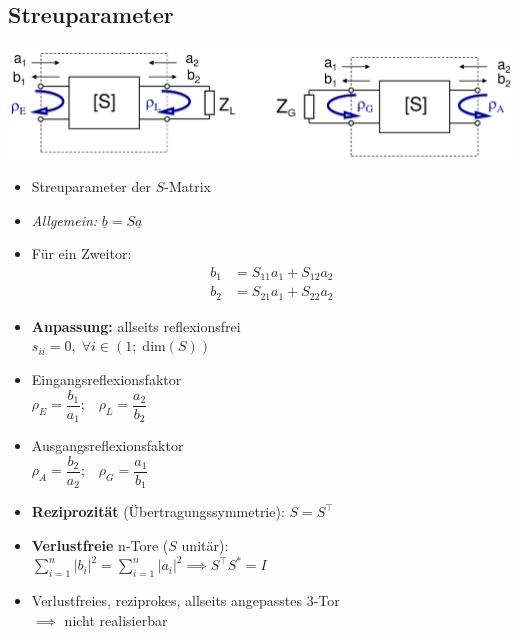 \subsection{Streuparameter}
\includegraphics[width=0.35\paperheight]{content/fuw/pictures/hf_zweitor_reflektion.png}
\begin{itemize}
    \itemsep0pt
    \item Streuparameter der $S$-Matrix
    \item \textit{Allgemein:} \(\underline{b} = S \underline{a}\)
    \item Für ein Zweitor:
    \begin{align*}
        b_1 &= S_{11} a_1 + S_{12} a_2\\
        b_2 &= S_{21} a_1 + S_{22} a_2
    \end{align*}
    \item \textbf{Anpassung:} allseits reflexionsfrei\\
        \(s_{ii} = 0, \;\forall i \in (1;\; \mathrm{dim}(S))\)
    \item Eingangsreflexionsfaktor\\
        \(\rho_E = \dfrac{b_1}{a_1}; \;\;\; \rho_L = \dfrac{a_2}{b_2}\)
    \item Ausgangsreflexionsfaktor\\
        \(\rho_A = \dfrac{b_2}{a_2}; \;\;\; \rho_G = \dfrac{a_1}{b_1}\)
    \item \textbf{Reziprozität} (Übertragungssymmetrie): \(S = S^\top\)
    \item \textbf{Verlustfreie} n-Tore ($S$ unitär):\\
        \(\sum^n_{i=1} |b_i|^2 = \sum^n_{i=1} |a_i|^2 \implies S^\top S^* = I\)
    \item Verlustfreies, reziprokes, allseits angepasstes 3-Tor\\
        \(\implies\) nicht realisierbar
\end{itemize}

